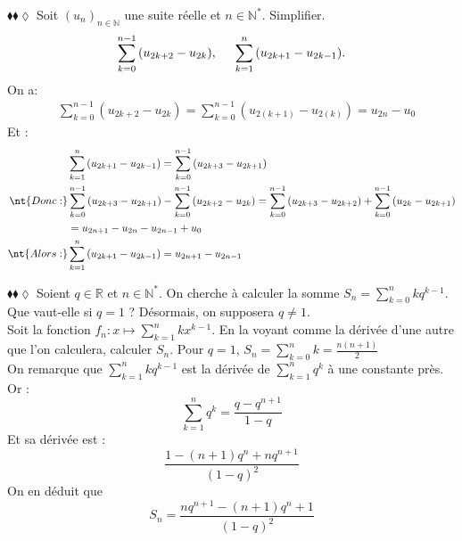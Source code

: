 \documentclass[11pt]{article}
\begin{document}
\begin{exercice}{$\blacklozenge\blacklozenge\lozenge$}{}
    Soit $(u_n)_{n\in\mathbb{N}}$ une suite réelle et $n\in\mathbb{N}^*$. Simplifier.
    \begin{equation*}
        \sum\limits^{n-1}_{k=0}{(u_{2k+2}-u_{2k})}, \hspace{0.5cm} \sum\limits^{n}_{k=1}{(u_{2k+1}-u_{2k-1})}.
    \end{equation*}
    \tcblower
    On a:
    \begin{align*}
        &\sum\limits^{n-1}_{k=0}{(u_{2k+2}-u_{2k})}=\sum\limits^{n-1}_{k=0}{(u_{2(k+1)}-u_{2(k)})}=u_{2n}-u_0
    \end{align*}
    Et :
    \begin{align*}
        &\sum\limits^{n}_{k=1}{(u_{2k+1}-u_{2k-1})}=\sum\limits^{n-1}_{k=0}{(u_{2k+3}-u_{2k+1})}\\
        \nt{Donc : }&\sum\limits^{n-1}_{k=0}{(u_{2k+3}-u_{2k+1})}-\sum\limits^{n-1}_{k=0}{(u_{2k+2}-u_{2k})}=\sum\limits^{n-1}_{k=0}{(u_{2k+3}-u_{2k+2})} + \sum\limits^{n-1}_{k=0}{(u_{2k}-u_{2k+1})}\\&=u_{2n+1}-u_{2n}-u_{2n-1}+u_{0}\\
        \nt{Alors :}&\sum\limits^{n}_{k=1}{(u_{2k+1}-u_{2k-1})}=u_{2n+1}-u_{2n-1}
    \end{align*}
\end{exercice}

\begin{exercice}{$\blacklozenge\blacklozenge\lozenge$}{}
    Soient $q\in\mathbb{R}$ et $n\in\mathbb{N}^*$. On cherche à calculer la somme $S_n=\sum\limits^{n}_{k=0}{kq^{k-1}}$.\\
    Que vaut-elle si $q=1$ ? Désormais, on supposera $q\neq 1$.\\
    Soit la fonction $f_n:x\mapsto\sum\limits^{n}_{k=1}{kx^{k-1}}$. En la voyant comme la dérivée d'une autre que l'on calculera, calculer $S_n$.
    \tcblower
    Pour $q=1$, $S_n=\sum\limits^{n}_{k=0}{k}=\frac{n(n+1)}{2}$\\
    On remarque que $\sum\limits^{n}_{k=1}{kq^{k-1}}$ est la dérivée de $\sum\limits^{n}_{k=1}{q^k}$ à une constante près.\\
    Or :
    \begin{equation*}
        \sum\limits^{n}_{k=1}{q^k}=\frac{q-q^{n+1}}{1-q}
    \end{equation*}
    Et sa dérivée est :
    \begin{equation*}
        \frac{1-(n+1)q^n+nq^{n+1}}{(1-q)^2}
    \end{equation*}
    On en déduit que \begin{equation*}S_n=\frac{nq^{n+1}-(n+1)q^n+1}{(1-q)^2}\end{equation*}
\end{exercice}
\end{document}
